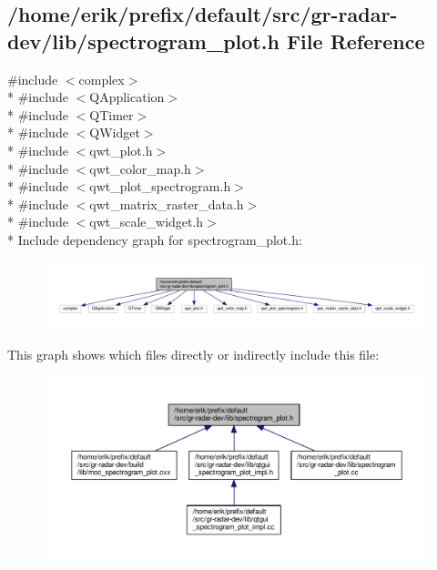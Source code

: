 \subsection{/home/erik/prefix/default/src/gr-\/radar-\/dev/lib/spectrogram\+\_\+plot.h File Reference}
\label{spectrogram__plot_8h}
{\ttfamily \#include $<$complex$>$}\\*
{\ttfamily \#include $<$Q\+Application$>$}\\*
{\ttfamily \#include $<$Q\+Timer$>$}\\*
{\ttfamily \#include $<$Q\+Widget$>$}\\*
{\ttfamily \#include $<$qwt\+\_\+plot.\+h$>$}\\*
{\ttfamily \#include $<$qwt\+\_\+color\+\_\+map.\+h$>$}\\*
{\ttfamily \#include $<$qwt\+\_\+plot\+\_\+spectrogram.\+h$>$}\\*
{\ttfamily \#include $<$qwt\+\_\+matrix\+\_\+raster\+\_\+data.\+h$>$}\\*
{\ttfamily \#include $<$qwt\+\_\+scale\+\_\+widget.\+h$>$}\\*
Include dependency graph for spectrogram\+\_\+plot.\+h\+:
\nopagebreak
\begin{figure}[H]
\begin{center}
\leavevmode
\includegraphics[width=350pt]{d3/d1d/spectrogram__plot_8h__incl}
\end{center}
\end{figure}
This graph shows which files directly or indirectly include this file\+:
\nopagebreak
\begin{figure}[H]
\begin{center}
\leavevmode
\includegraphics[width=350pt]{d2/d89/spectrogram__plot_8h__dep__incl}
\end{center}
\end{figure}
